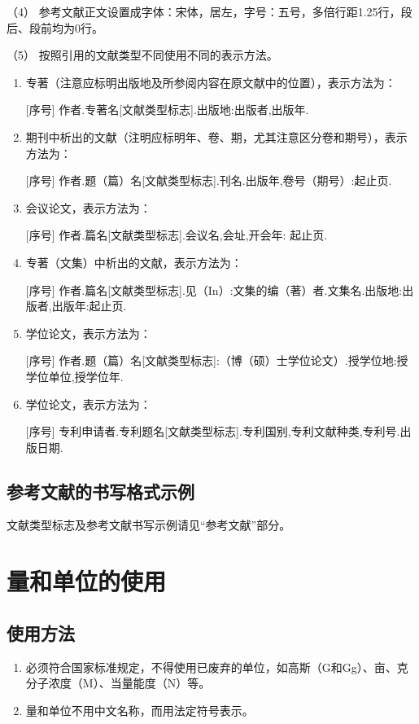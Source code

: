 （4） 参考文献正文设置成字体：宋体，居左，字号：五号，多倍行距1.25行，段后、段前均为0行。

（5） 按照引用的文献类型不同使用不同的表示方法。
\begin{enumerate}[label=\circled{\arabic*}]
\item 专著（注意应标明出版地及所参阅内容在原文献中的位置），表示方法为：

[序号] 作者.专著名[文献类型标志].出版地:出版者,出版年.
\item 期刊中析出的文献（注明应标明年、卷、期，尤其注意区分卷和期号），表示方法为：

[序号] 作者.题（篇）名[文献类型标志].刊名.出版年,卷号（期号）:起止页.
\item 会议论文，表示方法为：

[序号] 作者.篇名[文献类型标志].会议名,会址,开会年: 起止页.
\item 专著（文集）中析出的文献，表示方法为：

[序号] 作者.篇名[文献类型标志].见（In）:文集的编（著）者.文集名.出版地:出版者,出版年:起止页.
\item 学位论文，表示方法为：

[序号] 作者.题（篇）名[文献类型标志]:（博（硕）士学位论文）.授学位地:授学位单位,授学位年.
\item 学位论文，表示方法为：

[序号] 专利申请者.专利题名[文献类型标志].专利国别,专利文献种类,专利号.出版日期.
\end{enumerate}

\subsection{参考文献的书写格式示例}
文献类型标志及参考文献书写示例请见“参考文献”部分。

\section{量和单位的使用}
\subsection{使用方法}
\begin{enumerate}
\item 必须符合国家标准规定，不得使用已废弃的单位，如高斯（G和Gg）、亩、克分子浓度（M）、当量能度（N）等。
\item 量和单位不用中文名称，而用法定符号表示。
\end{enumerate}

